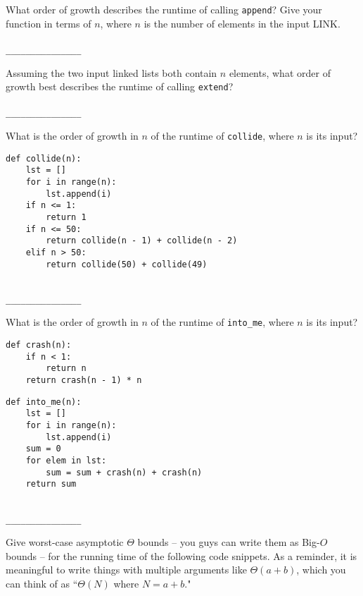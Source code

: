 \documentclass[twoside]{article}
\begin{document}
\begin{enumerate}
\begin{enumerate}
What order of growth describes the runtime of calling \texttt{append}? Give your function in terms of $n$, where $n$ is the number of elements in the input LINK.
~\\\\
\lstinline{_______________}

Assuming the two input linked lists both contain $n$ elements, what order of growth best describes the runtime of calling \texttt{extend}?
~\\\\
\lstinline{_______________}
\end{enumerate}


\begin{enumerate}
What is the order of growth in $n$ of the runtime of \texttt{collide}, where $n$ is its input?

\begin{lstlisting}
def collide(n):
    lst = []
    for i in range(n):
        lst.append(i)
    if n <= 1:
        return 1
    if n <= 50:
        return collide(n - 1) + collide(n - 2)
    elif n > 50:
        return collide(50) + collide(49)
\end{lstlisting}
~\\
\lstinline{_______________}

What is the order of growth in $n$ of the runtime of \texttt{into\_me}, where $n$ is its input?

\begin{lstlisting}
def crash(n):
    if n < 1:
        return n
    return crash(n - 1) * n
\end{lstlisting}

\newpage

\begin{lstlisting}
def into_me(n):
    lst = []
    for i in range(n):
        lst.append(i)
    sum = 0
    for elem in lst:
        sum = sum + crash(n) + crash(n)
    return sum
\end{lstlisting}
~\\
\lstinline{_______________}
\end{enumerate}


Give worst-case asymptotic $\Theta$ bounds -- you guys can write them as Big-$O$ bounds -- for the running time of the following code snippets. As a reminder, it is meaningful to write things with multiple arguments like $\Theta(a + b)$, which you can think of as ``$\Theta(N)$ where $N = a + b$."


\end{enumerate}
\end{document}
